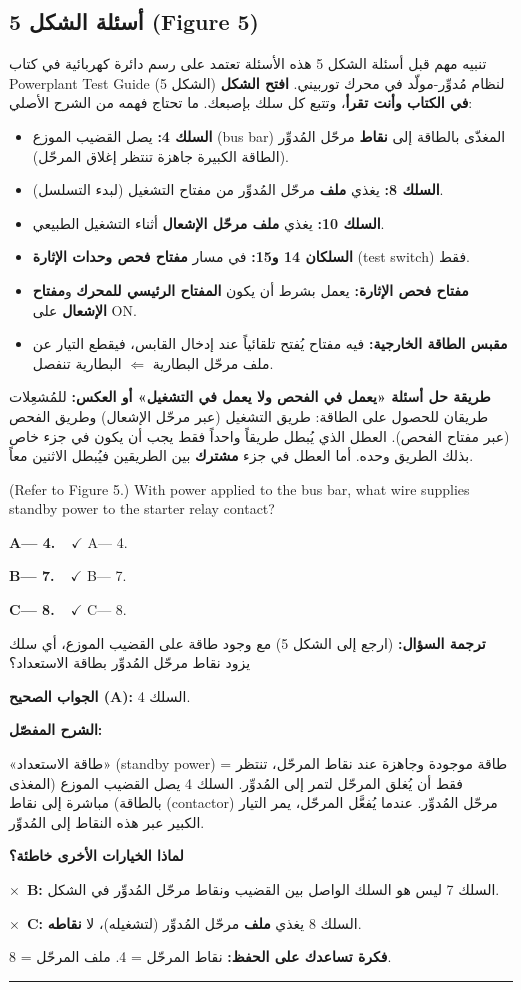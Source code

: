 \documentclass[11pt,a4paper]{article}
\newcommand{\en}[1]{\textenglish{#1}}
\newcommand{\correctletter}{}
\newcommand{\opt}[2]{%
  \ifdefstring{\correctletter}{#1}%
    {\textcolor{ansgreen}{\textbf{#1— #2\ \ $\checkmark$}}}%
    {#1— #2}\par}
\newcommand{\Q}[6]{%
  \renewcommand{\correctletter}{#6}%
  \par\bigskip
  \phantomsection\label{q#1}%
  \begin{tcolorbox}[enhanced,breakable,colback=qback,colframe=qframe,
      arc=2mm,boxrule=0.8pt,fonttitle=\bfseries,
      title={\en{Question #1}}]
    \begin{english}
      #2\par\smallskip
      \opt{A}{#3}\opt{B}{#4}\opt{C}{#5}
    \end{english}
  \end{tcolorbox}}
\newcommand{\tr}[1]{\textbf{\textcolor{qframe}{ترجمة السؤال:}} #1\par}
\newcommand{\ans}[2]{%
  \begin{tcolorbox}[colback=ansback,colframe=ansgreen,boxrule=0.6pt,arc=1.5mm,
      left=4pt,right=4pt,top=2pt,bottom=2pt]
    \textbf{\textcolor{ansgreen}{الجواب الصحيح (\en{#1}):}} #2
  \end{tcolorbox}}
\newcommand{\sharh}[1]{\textbf{\textcolor{conceptc}{الشرح المفصّل:}}\par #1\par}
\newcommand{\nohead}{\textbf{\textcolor{wrongc}{لماذا الخيارات الأخرى خاطئة؟}}\par}
\newcommand{\no}[2]{\hspace*{1em}\textcolor{wrongc}{$\times$}\ \textbf{\en{#1}:} #2\par}
\newcommand{\tip}[1]{%
  \begin{tcolorbox}[colback=tipback,colframe=tipframe,boxrule=0.5pt,arc=1.5mm,
      left=4pt,right=4pt,top=2pt,bottom=2pt]
    \textbf{فكرة تساعدك على الحفظ:} #1
  \end{tcolorbox}}
\newcommand{\qsep}{\par\medskip\noindent\textcolor{qframe!40}{\rule{\linewidth}{0.4pt}}\par}
\begin{document}
\subsection{أسئلة الشكل 5 (\en{Figure 5})}
\begin{concept}{تنبيه مهم قبل أسئلة الشكل 5}
هذه الأسئلة تعتمد على رسم دائرة كهربائية في كتاب \en{Powerplant Test Guide} (الشكل 5) لنظام مُدوِّر-مولّد في محرك توربيني. \textbf{افتح الشكل في الكتاب وأنت تقرأ}، وتتبع كل سلك بإصبعك. ما تحتاج فهمه من الشرح الأصلي:
\begin{itemize}
  \item \textbf{السلك 4:} يصل القضيب الموزع (\en{bus bar}) المغذّى بالطاقة إلى \textbf{نقاط} مرحّل المُدوِّر (الطاقة الكبيرة جاهزة تنتظر إغلاق المرحّل).
  \item \textbf{السلك 8:} يغذي \textbf{ملف} مرحّل المُدوِّر من مفتاح التشغيل (لبدء التسلسل).
  \item \textbf{السلك 10:} يغذي \textbf{ملف مرحّل الإشعال} أثناء التشغيل الطبيعي.
  \item \textbf{السلكان 14 و15:} في مسار \textbf{مفتاح فحص وحدات الإثارة} (\en{test switch}) فقط.
  \item \textbf{مفتاح فحص الإثارة:} يعمل بشرط أن يكون \textbf{المفتاح الرئيسي للمحرك} و\textbf{مفتاح الإشعال} على \en{ON}.
  \item \textbf{مقبس الطاقة الخارجية:} فيه مفتاح يُفتح تلقائياً عند إدخال القابس، فيقطع التيار عن ملف مرحّل البطارية $\Leftarrow$ البطارية تنفصل.
\end{itemize}
\textbf{طريقة حل أسئلة «يعمل في الفحص ولا يعمل في التشغيل» أو العكس:} للمُشعِلات طريقان للحصول على الطاقة: طريق التشغيل (عبر مرحّل الإشعال) وطريق الفحص (عبر مفتاح الفحص). العطل الذي يُبطل طريقاً واحداً فقط يجب أن يكون في جزء خاص بذلك الطريق وحده. أما العطل في جزء \textbf{مشترك} بين الطريقين فيُبطل الاثنين معاً.
\end{concept}

\Q{8614}{(Refer to Figure 5.) With power applied to the bus bar, what wire supplies standby power to the starter relay contact?}
{4.}
{7.}
{8.}{A}
\tr{(ارجع إلى الشكل 5) مع وجود طاقة على القضيب الموزع، أي سلك يزود نقاط مرحّل المُدوِّر بطاقة الاستعداد؟}
\ans{A}{السلك 4.}
\sharh{«طاقة الاستعداد» (\en{standby power}) = طاقة موجودة وجاهزة عند نقاط المرحّل، تنتظر فقط أن يُغلق المرحّل لتمر إلى المُدوِّر. السلك 4 يصل القضيب الموزع (المغذى بالطاقة) مباشرة إلى نقاط (\en{contactor}) مرحّل المُدوِّر. عندما يُفعَّل المرحّل، يمر التيار الكبير عبر هذه النقاط إلى المُدوِّر.}
\nohead
\no{B}{السلك 7 ليس هو السلك الواصل بين القضيب ونقاط مرحّل المُدوِّر في الشكل.}
\no{C}{السلك 8 يغذي \textbf{ملف} مرحّل المُدوِّر (لتشغيله)، لا \textbf{نقاطه}.}
\tip{نقاط المرحّل = 4. ملف المرحّل = 8.}
\qsep
\end{document}
